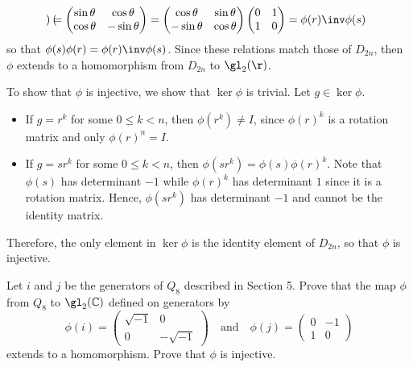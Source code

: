 \begin{solalph}
\[\begin{pmatrix}
    \end{pmatrix} = 
    \begin{pmatrix}
        \sin \theta & \cos \theta \\
        \cos \theta & -\sin \theta
    \end{pmatrix} = 
    \begin{pmatrix}
        \cos \theta & \sin \theta \\
        -\sin \theta & \cos \theta
    \end{pmatrix}
    \begin{pmatrix}
        0 & 1 \\
        1 & 0
    \end{pmatrix} = \phi(r)\inv \phi(s)\]
    so that $\phi(s)\phi(r) = \phi(r)\inv \phi(s)$. Since these relations match those of $D_{2n}$, then $\phi$ extends to a homomorphism from $D_{2n}$ to $\gl_2(\r)$.
    \item To show that $\phi$ is injective, we show that $\ker\phi$ is trivial. Let $g \in \ker\phi$.
    \begin{itemize}
        \item If $g = r^k$ for some $0 \leq k < n$, then $\phi(r^k) \neq I$, since $\phi(r)^k$ is a rotation matrix and only $\phi(r)^n = I$.
        \item If $g = sr^k$ for some $0 \leq k < n$, then $\phi(sr^k) = \phi(s)\phi(r)^k$. Note that $\phi(s)$ has determinant $-1$ while $\phi(r)^k$ has determinant $1$ since it is a rotation matrix. Hence, $\phi(sr^k)$ has determinant $-1$ and cannot be the identity matrix.
    \end{itemize}
    Therefore, the only element in $\ker\phi$ is the identity element of $D_{2n}$, so that $\phi$ is injective.
\end{solalph}

\begin{exercise}\label{ex1.6.26}
    Let $i$ and $j$ be the generators of $Q_8$ described in Section 5. Prove that the map $\phi$ from $Q_8$ to $\gl_2(\mathbb{C})$ defined on generators by
    \[\phi(i) = 
    \begin{pmatrix}
        \sqrt{-1} & 0 \\
        0 & -\sqrt{-1}
    \end{pmatrix}
    \quad \text{and} \quad
    \phi(j) = 
    \begin{pmatrix}
        0 & -1 \\
        1 & 0
    \end{pmatrix}
    \]
    extends to a homomorphism. Prove that $\phi$ is injective.
\end{exercise}


